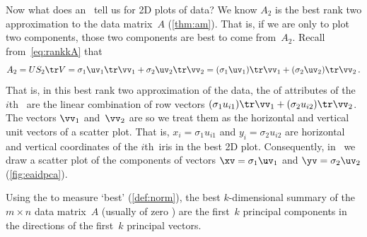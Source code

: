 Now what does an \svd\ tell us for 2D plots of data?  
We know \(A_2\) is the best rank two approximation to the data matrix~\(A\) (\cref{thm:am}). 
That is, if we are only to plot two components, those two components are best to come from~\(A_2\).
Recall from~\eqref{eq:rankkA} that
\begin{equation*}
A_2=US_2\tr V =\sigma_1\uv_1\tr\vv_1 +\sigma_2\uv_2\tr\vv_2
=(\sigma_1\uv_1)\tr\vv_1 +(\sigma_2\uv_2)\tr\vv_2\,.
\end{equation*}
That is, in this best rank two approximation of the data, the  of attributes of the \(i\)th~ are the linear combination of row vectors \((\sigma_1u_{i1})\tr\vv_1+(\sigma_2u_{i2})\tr\vv_2\).
The vectors \(\vv_1\) and~\(\vv_2\) are  so we treat them as the horizontal and vertical unit vectors of a scatter plot. 
That is, \(x_i=\sigma_1u_{i1}\) and \(y_i=\sigma_2u_{i2}\) are horizontal and vertical coordinates of the \(i\)th~iris in the best 2D plot.
Consequently, in \script\ we draw a scatter plot of the components of vectors \(\xv=\sigma_1\uv_1\) and \(\yv=\sigma_2\uv_2\) (\cref{fig:eaidpca}).


\begin{theorem} \label{thm:pc}
Using the  to measure `best' (\cref{def:norm}), the best \(k\)-dimensional summary of the \(m\times n\) data matrix~\(A\)  (usually of zero ) are the first~\(k\) principal components in the directions of the first~\(k\) principal vectors.
\end{theorem}

